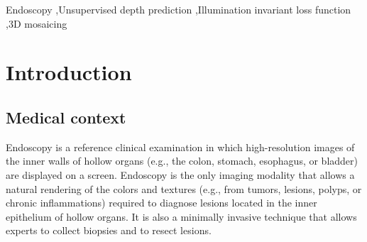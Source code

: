 \documentclass[a4paper,fleqn]{cas-dc}
\begin{document}

\begin{keywords}
Endoscopy \sep Unsupervised depth prediction \sep Illumination invariant loss function \sep 3D mosaicing
\end{keywords}

%
\section{Introduction \label{sec:introduction}}
%
\subsection{Medical context \label{sec:medicalContext}}
Endoscopy is a reference clinical examination in which high-resolution images of the inner walls of hollow organs (e.g., the colon, stomach, esophagus, or bladder) are displayed on a screen. Endoscopy is the only imaging modality that allows a natural rendering of the colors and textures (e.g., from tumors, lesions, polyps, or chronic inflammations) required to diagnose lesions  located in the inner epithelium of hollow organs. It is also a minimally invasive technique that allows experts to collect biopsies and to resect lesions.  
\end{document}
